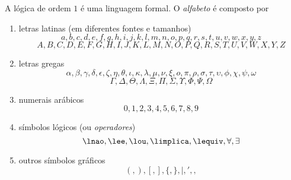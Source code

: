 A lógica de ordem $1$ é uma linguagem formal. O \emph{alfabeto} é composto por
	\begin{enumerate}
	\item letras latinas (em diferentes fontes e tamanhos)
	\begin{equation*}
	a, b, c, d, e, f, g, h, i, j, k, l, m, n, o, p, q, r, s, t, u, v, w, x, y, z
	\end{equation*}
	\begin{equation*}
	A, B, C, D, E, F, G, H, I, J, K, L, M, N, O, P, Q, R, S, T, U, V, W, X, Y, Z
	\end{equation*}
	
	\item letras gregas
		\begin{equation*}
	\alpha,\beta,\gamma,\delta,\epsilon,\zeta,\eta,\theta,\iota,\kappa,\lambda,\mu,\nu,\xi,o,\pi,\rho,\sigma,\tau,\upsilon,\phi,\chi,\psi,\omega
	\end{equation*}
	\begin{equation*}
	\Gamma, \Delta, \Theta, \Lambda, \Xi, \Pi, \Sigma, \Upsilon, \Phi, \Psi, \Omega
	\end{equation*}
		
	\item numerais arábicos
	\begin{equation*}
	0, 1, 2, 3, 4, 5, 6, 7, 8, 9
	\end{equation*}
	
	\item símbolos lógicos (ou \emph{operadores})
	\begin{equation*}
	 \lnao, \lee, \lou, \limplica, \lequiv, \forall, \exists
	 \end{equation*}
	
	\item outros símbolos gráficos
	\begin{equation*}
	(, ), [, ], \{, \}, |, ', ,
	\end{equation*}
	\end{enumerate}
 
